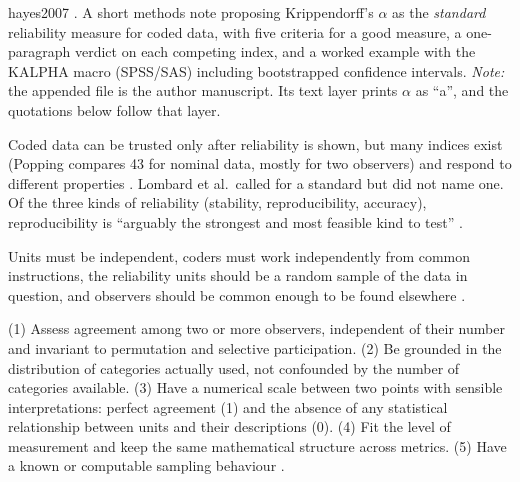 \begin{papercard}{hayes2007}
 . A short methods note proposing Krippendorff's $\alpha$ as the \emph{standard} reliability measure for coded data, with five criteria for a good measure, a one-paragraph verdict on each competing index, and a worked example with the KALPHA macro (SPSS/SAS) including bootstrapped confidence intervals. \emph{Note:} the appended file is the author manuscript. Its text layer prints $\alpha$ as ``a'', and the quotations below follow that layer.

 Coded data can be trusted only after reliability is shown, but many indices exist (Popping compares 43 for nominal data, mostly for two observers) and respond to different properties . Lombard et al.\ called for a standard but did not name one. Of the three kinds of reliability (stability, reproducibility, accuracy), reproducibility is ``arguably the strongest and most feasible kind to test'' .

 Units must be independent, coders must work independently from common instructions, the reliability units should be a random sample of the data in question, and observers should be common enough to be found elsewhere .

 (1) Assess agreement among two or more observers, independent of their number and invariant to permutation and selective participation. (2) Be grounded in the distribution of categories actually used, not confounded by the number of categories available. (3) Have a numerical scale between two points with sensible interpretations: perfect agreement (1) and the absence of any statistical relationship between units and their descriptions (0). (4) Fit the level of measurement and keep the same mathematical structure across metrics. (5) Have a known or computable sampling behaviour .


\end{papercard}

